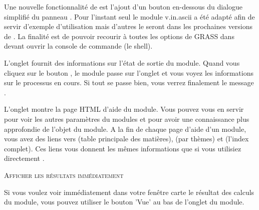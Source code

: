 {Une nouvelle fonctionnalité de \qg \CURRENT est l'ajout d'un bouton  en-dessous du dialogue simplifié du panneau . Pour l'instant seul le module v.in.ascii a été adapté afin de servir d'exemple d'utilisation mais d'autres le seront dans les prochaines versions de \qg. La finalité est de pouvoir recourir à toutes les options de GRASS dans devant ouvrir la console de commande (le shell).


L'onglet  fournit des informations sur l'état de sortie du module. Quand vous cliquez sur le bouton , le module passe sur l'onglet  et vous voyez les informations sur le processus en cours. Si tout se passe bien, vous verrez finalement le message .


L'onglet  montre la page HTML d'aide du module. Vous pouvez vous en servir pour voir les autres paramètres du modules et pour avoir une
connaissance plus approfondie de l'objet du module. A la fin de chaque page d'aide d'un module, vous avez des liens vers  (table principale des matières), (par thèmes) et (l'index complet). Ces liens vous donnent les mêmes informations que si vous utilisiez directement .

\begin{Tip}\caption{\textsc{Afficher les résultats immédiatement}}
Si vous voulez voir immédiatement dans votre fenêtre carte le résultat des calculs du module, vous pouvez utiliser le bouton 'Vue' au bas de l'onglet du module.
\end{Tip} 

}

